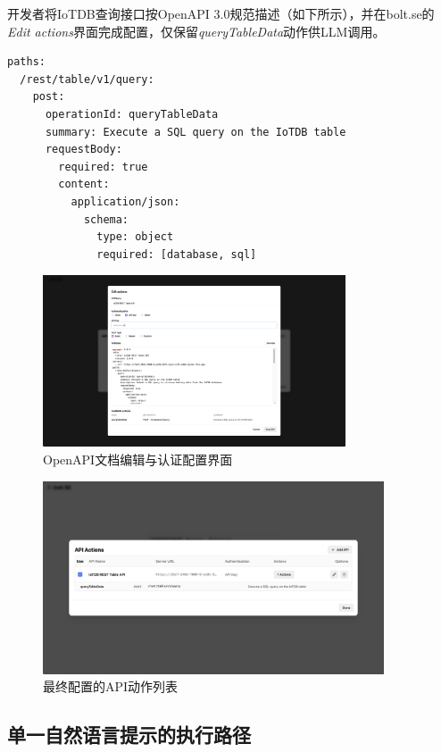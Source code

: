 开发者将IoTDB查询接口按OpenAPI 3.0规范描述（如下所示），并在bolt.se的\textit{Edit actions}界面完成配置，仅保留\textit{queryTableData}动作供LLM调用。

\begin{verbatim}
paths:
  /rest/table/v1/query:
    post:
      operationId: queryTableData
      summary: Execute a SQL query on the IoTDB table
      requestBody:
        required: true
        content:
          application/json:
            schema:
              type: object
              required: [database, sql]
\end{verbatim}

\begin{figure}[htbp]
  \centering
  \includegraphics[width=0.8\textwidth]{figures/screenshots/iotdb-demo/openapi-editor.png}
  \caption{OpenAPI文档编辑与认证配置界面}
  \label{fig:openapi-editor}
\end{figure}

\clearpage

\begin{figure}[t]
  \centering
  \includegraphics[width=0.9\textwidth]{figures/screenshots/iotdb-demo/api-actions.png}
  \caption{最终配置的API动作列表}
  \label{fig:api-actions}
\end{figure}

\subsection{单一自然语言提示的执行路径}

